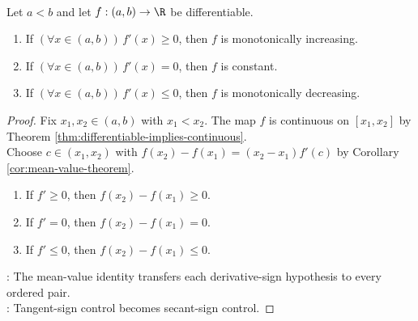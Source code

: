 \begin{theorem} \label{thm:derivative-sign-monotonicity} \\
Let $a<b$ and let $f:(a,b)\to\R$ be differentiable.
\begin{enumerate}[label=(\roman*)]
\setlength{\itemsep}{0pt}
\item If $(\forall x\in(a,b))\,f'(x)\geq0$, then $f$ is monotonically increasing.
\item If $(\forall x\in(a,b))\,f'(x)=0$, then $f$ is constant.
\item If $(\forall x\in(a,b))\,f'(x)\leq0$, then $f$ is monotonically decreasing.
\end{enumerate}
\begin{proof}
Fix $x_1,x_2\in(a,b)$ with $x_1<x_2$. The map $f$ is continuous on $[x_1,x_2]$ by Theorem \ref{thm:differentiable-implies-continuous}.\\
Choose $c\in(x_1,x_2)$ with $f(x_2)-f(x_1)=(x_2-x_1)f'(c)$ by Corollary \ref{cor:mean-value-theorem}.
\begin{enumerate}[label=(\roman*)]
\setlength{\itemsep}{0pt}
\item If $f'\geq0$, then $f(x_2)-f(x_1)\geq0$.
\item If $f'=0$, then $f(x_2)-f(x_1)=0$.
\item If $f'\leq0$, then $f(x_2)-f(x_1)\leq0$.
\end{enumerate}
: The mean-value identity transfers each derivative-sign hypothesis to every ordered pair.\\
: Tangent-sign control becomes secant-sign control.
\end{proof}
\end{theorem}

